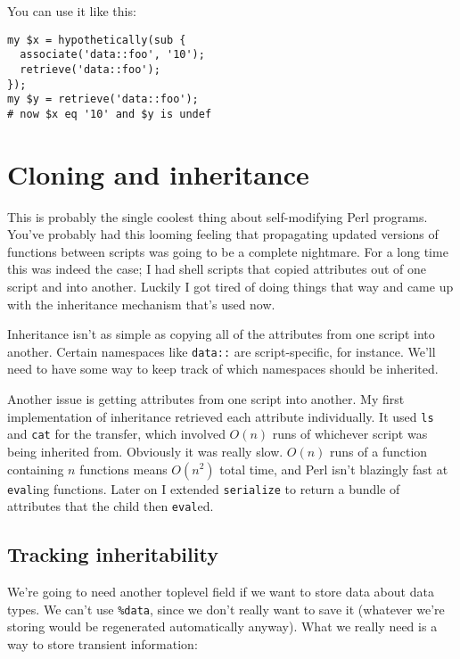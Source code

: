 \documentclass{report}
\begin{document}

    You can use it like this:

\begin{verbatim}
my $x = hypothetically(sub {
  associate('data::foo', '10');
  retrieve('data::foo');
});
my $y = retrieve('data::foo');
# now $x eq '10' and $y is undef
\end{verbatim}
\chapter{Cloning and inheritance}\label{sec:cloning-and-inheritance}
  This is probably the single coolest thing about self-modifying Perl programs. You've probably had this looming feeling that propagating updated versions of functions between scripts was
  going to be a complete nightmare. For a long time this was indeed the case; I had shell scripts that copied attributes out of one script and into another. Luckily I got tired of doing things
  that way and came up with the inheritance mechanism that's used now.

  Inheritance isn't as simple as copying all of the attributes from one script into another. Certain namespaces like {\tt data::} are script-specific, for instance. We'll need to have some way
  to keep track of which namespaces should be inherited.

  Another issue is getting attributes from one script into another. My first implementation of inheritance retrieved each attribute individually. It used {\tt ls} and {\tt cat} for the
  transfer, which involved $O(n)$ runs of whichever script was being inherited from. Obviously it was really slow. $O(n)$ runs of a function containing $n$ functions means $O(n^2)$ total time,
  and Perl isn't blazingly fast at {\tt eval}ing functions. Later on I extended {\tt serialize} to return a bundle of attributes that the child then {\tt eval}ed.

\section{Tracking inheritability}\label{sec:cloning-and-inheritance-tracking-inheritability}
    We're going to need another toplevel field if we want to store data about data types. We can't use \verb|%data|, since we don't really want to save it (whatever we're storing would be
    regenerated automatically anyway). What we really need is a way to store transient information:
\end{document}
